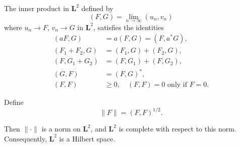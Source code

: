The inner product in $\mathbf{L}^2$ defined by
$$
(F, G) = \lim_{n \to \infty} (u_n, v_n)
$$
where $u_n \to F$, $v_n \to G$ in $\mathbf{L}^2$, satisfies the identities
\begin{align}
(aF, G) &= a(F, G) = (F, a^*G), \\
(F_1 + F_2, G) &= (F_1, G) + (F_2, G), \\
(F, G_1 + G_2) &= (F, G_1) + (F, G_2), \\
(G, F) &= (F, G)^*, \\
(F, F) &\geq 0, \quad (F, F) = 0 \text{ only if } F = 0.
\end{align}

Define
$$
\|F\| = (F, F)^{1/2}.
$$

Then $\|\cdot\|$ is a norm on $\mathbf{L}^2$, and $\mathbf{L}^2$ is complete with respect to this norm. Consequently, $\mathbf{L}^2$ is a Hilbert space.
